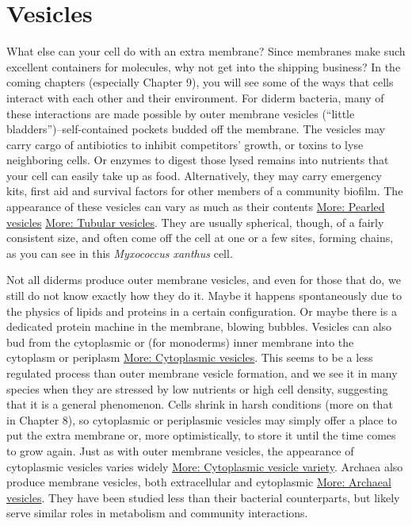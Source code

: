 \documentclass[]{tufte-book}
\begin{document}
\hypertarget{vesicles}{%
\section{Vesicles}\label{vesicles}}

What else can your cell do with an extra membrane? Since membranes make such excellent containers for molecules, why not get into the shipping business? In the coming chapters (especially Chapter 9), you will see some of the ways that cells interact with each other and their environment. For diderm bacteria, many of these interactions are made possible by outer membrane vesicles (``little bladders'')--self-contained pockets budded off the membrane. The vesicles may carry cargo of antibiotics to inhibit competitors' growth, or toxins to lyse neighboring cells. Or enzymes to digest those lysed remains into nutrients that your cell can easily take up as food. Alternatively, they may carry emergency kits, first aid and survival factors for other members of a community biofilm. The appearance of these vesicles can vary as much as their contents \protect\hyperlink{Pearled_vesicles}{More: Pearled vesicles} \protect\hyperlink{Tubular_vesicles}{More: Tubular vesicles}. They are usually spherical, though, of a fairly consistent size, and often come off the cell at one or a few sites, forming chains, as you can see in this \emph{Myxococcus xanthus} cell.

Not all diderms produce outer membrane vesicles, and even for those that do, we still do not know exactly how they do it. Maybe it happens spontaneously due to the physics of lipids and proteins in a certain configuration. Or maybe there is a dedicated protein machine in the membrane, blowing bubbles. Vesicles can also bud from the cytoplasmic or (for monoderms) inner membrane into the cytoplasm or periplasm \protect\hyperlink{Cytoplasmic_vesicles}{More: Cytoplasmic vesicles}. This seems to be a less regulated process than outer membrane vesicle formation, and we see it in many species when they are stressed by low nutrients or high cell density, suggesting that it is a general phenomenon. Cells shrink in harsh conditions (more on that in Chapter 8), so cytoplasmic or periplasmic vesicles may simply offer a place to put the extra membrane or, more optimistically, to store it until the time comes to grow again. Just as with outer membrane vesicles, the appearance of cytoplasmic vesicles varies widely \protect\hyperlink{Cytoplasmic_vesicle_variety}{More: Cytoplasmic vesicle variety}. Archaea also produce membrane vesicles, both extracellular and cytoplasmic \protect\hyperlink{Archaeal_vesicles}{More: Archaeal vesicles}. They have been studied less than their bacterial counterparts, but likely serve similar roles in metabolism and community interactions.
\end{document}
